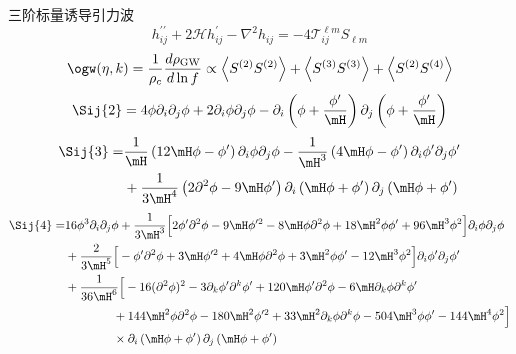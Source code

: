 \documentclass[xcolor={svgnames},compress]{beamer}
\newcommand{\avg}[1]{\left \langle #1 \right \rangle}
\def\p{\partial}
\def\({\left(}
\def\){\right)}
\def\({\left(}
\def\){\right)}
\begin{document}
\begin{frame}{三阶标量诱导引力波}
    \vspace{-3mm}
        \small{\[
            h_{i j}^{\prime \prime}+2 \mathcal{H} h_{i j}^{\prime}-\nabla^{2} h_{i j}=-4 \mathcal{T}_{i j}^{\ell m} S_{\ell m}
            \]
            \[
            \ogw(\eta, k)=\frac{1}{\rho_c} \frac{d\rho_{\mathrm{GW}}}{d \ln f} \propto \avg{S^{(2)}S^{(2)}} + \avg{S^{(3)}S^{(3)}} + \avg{S^{(2)}S^{(4)}}
            \]}
           {\tiny \[
            \Sij{2}= 4 \phi \p_i\p_j\phi + 2\p_i\phi\p_j\phi-\p_i \(\phi + {\phi'\over\mH}\)
            \p_j\(\phi + {\phi'\over\mH}\)
            \]            
            \[
            \begin{split}
                \Sij{3} =& \frac{1}{\mH} \(12\mH \phi - \phi'\) \p_i\phi \p_j\phi
                - \frac{1}{\mH^3} \(4\mH \phi - \phi'\)\p_i\phi'\p_j\phi' \\
                &+ \frac{1}{3\mH^4} \(2\p^2\phi - 9\mH \phi'\) \p_i\(\mH\phi +\phi'\)
                \p_j\(\mH\phi +\phi'\)
            \end{split}
            \]            
            \[
            \begin{split}
                \Sij{4} =& 16 \phi^3 \p_i\p_j\phi
                + \frac{1}{3\mH^3} \Big[2 \phi' \p^2\phi - 9\mH \phi'^2 
                - 8\mH \phi \p^2\phi + 18 \mH^2 \phi \phi'
                + 96\mH^3 \phi^2\Big] \p_i\phi\p_j\phi \\
                &+ \frac{2}{3\mH^5} \Big[- \phi' \p^2\phi + 3\mH \phi'^2 
                + 4\mH \phi \p^2\phi + 3 \mH^2 \phi \phi'- 12\mH^3 \phi^2\Big] \p_i\phi' \p_j\phi'\\
                &+ \frac{1}{36\mH^6} \Big[ 
                -16 (\p^2\phi)^2 - 3  \partial_k\phi' \partial^k\phi'
                + 120 \mH \phi' \p^2\phi - 6 \mH \partial_k\phi \partial^k\phi'	\\
                &\qquad\qquad + 144 \mH^2 \phi \p^2\phi - 180 \mH^2 \phi'^2 
                + 33 \mH^2 \partial_k\phi \partial^k\phi- 504 \mH^3 \phi \phi'
                - 144 \mH^4 \phi^2
                \Big] \\
                &\qquad\qquad\times  \p_i\(\mH\phi +\phi'\)
                \p_j\(\mH\phi +\phi'\)
            \end{split}
            \]
        }
\end{frame}
\end{document}
